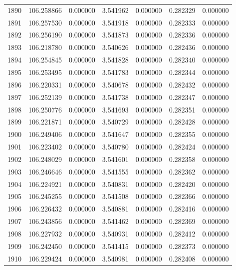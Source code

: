 \begin{tabular}{rrrrrrr}
1890 & 106.258866 &    0.000000 &  3.541962 &   0.000000 &   0.282329 &  0.000000 \\
1891 & 106.257530 &    0.000000 &  3.541918 &   0.000000 &   0.282333 &  0.000000 \\
1892 & 106.256190 &    0.000000 &  3.541873 &   0.000000 &   0.282336 &  0.000000 \\
1893 & 106.218780 &    0.000000 &  3.540626 &   0.000000 &   0.282436 &  0.000000 \\
1894 & 106.254845 &    0.000000 &  3.541828 &   0.000000 &   0.282340 &  0.000000 \\
1895 & 106.253495 &    0.000000 &  3.541783 &   0.000000 &   0.282344 &  0.000000 \\
1896 & 106.220331 &    0.000000 &  3.540678 &   0.000000 &   0.282432 &  0.000000 \\
1897 & 106.252139 &    0.000000 &  3.541738 &   0.000000 &   0.282347 &  0.000000 \\
1898 & 106.250776 &    0.000000 &  3.541693 &   0.000000 &   0.282351 &  0.000000 \\
1899 & 106.221871 &    0.000000 &  3.540729 &   0.000000 &   0.282428 &  0.000000 \\
1900 & 106.249406 &    0.000000 &  3.541647 &   0.000000 &   0.282355 &  0.000000 \\
1901 & 106.223402 &    0.000000 &  3.540780 &   0.000000 &   0.282424 &  0.000000 \\
1902 & 106.248029 &    0.000000 &  3.541601 &   0.000000 &   0.282358 &  0.000000 \\
1903 & 106.246646 &    0.000000 &  3.541555 &   0.000000 &   0.282362 &  0.000000 \\
1904 & 106.224921 &    0.000000 &  3.540831 &   0.000000 &   0.282420 &  0.000000 \\
1905 & 106.245255 &    0.000000 &  3.541508 &   0.000000 &   0.282366 &  0.000000 \\
1906 & 106.226432 &    0.000000 &  3.540881 &   0.000000 &   0.282416 &  0.000000 \\
1907 & 106.243856 &    0.000000 &  3.541462 &   0.000000 &   0.282369 &  0.000000 \\
1908 & 106.227932 &    0.000000 &  3.540931 &   0.000000 &   0.282412 &  0.000000 \\
1909 & 106.242450 &    0.000000 &  3.541415 &   0.000000 &   0.282373 &  0.000000 \\
1910 & 106.229424 &    0.000000 &  3.540981 &   0.000000 &   0.282408 &  0.000000 \\

\end{tabular}
